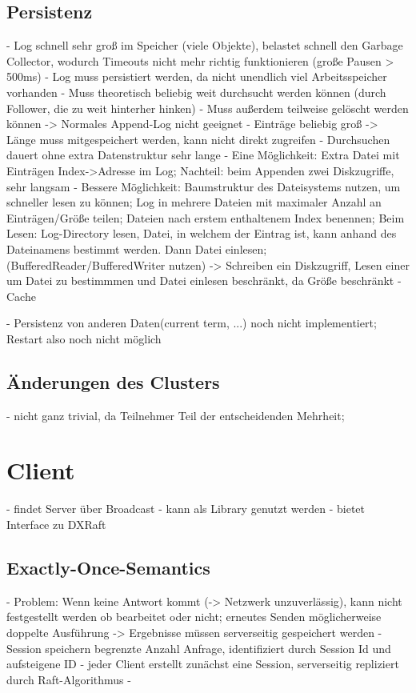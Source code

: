 \subsection{Persistenz}

- Log schnell sehr groß im Speicher (viele Objekte), belastet schnell den Garbage Collector, wodurch Timeouts nicht mehr richtig funktionieren (große Pausen > 500ms)
- Log muss persistiert werden, da nicht unendlich viel Arbeitsspeicher vorhanden
- Muss theoretisch beliebig weit durchsucht werden können (durch Follower, die zu weit hinterher hinken)
- Muss außerdem teilweise gelöscht werden können -> Normales Append-Log nicht geeignet
- Einträge beliebig groß -> Länge muss mitgespeichert werden, kann nicht direkt zugreifen
- Durchsuchen dauert ohne extra Datenstruktur sehr lange
- Eine Möglichkeit: Extra Datei mit Einträgen Index->Adresse im Log; Nachteil: beim Appenden zwei Diskzugriffe, sehr langsam
- Bessere Möglichkeit: Baumstruktur des Dateisystems nutzen, um schneller lesen zu können; Log in mehrere Dateien mit maximaler Anzahl an Einträgen/Größe teilen; Dateien nach erstem enthaltenem Index benennen; Beim Lesen: Log-Directory lesen, Datei, in welchem der Eintrag ist, kann anhand des Dateinamens bestimmt werden. Dann Datei einlesen; (BufferedReader/BufferedWriter nutzen) -> Schreiben ein Diskzugriff, Lesen einer um Datei zu bestimmmen und Datei einlesen beschränkt, da Größe beschränkt
- Cache

- Persistenz von anderen Daten(current term, ...) noch nicht implementiert; Restart also noch nicht möglich

\subsection{Änderungen des Clusters}

- nicht ganz trivial, da Teilnehmer Teil der entscheidenden Mehrheit; 

\section{Client}

- findet Server über Broadcast
- kann als Library genutzt werden
- bietet Interface zu DXRaft

\subsection{Exactly-Once-Semantics}

- Problem: Wenn keine Antwort kommt (-> Netzwerk unzuverlässig), kann nicht festgestellt werden ob bearbeitet oder nicht; erneutes Senden möglicherweise doppelte Ausführung -> Ergebnisse müssen serverseitig gespeichert werden
- Session speichern begrenzte Anzahl Anfrage, identifiziert durch Session Id und aufsteigene ID
- jeder Client erstellt zunächst eine Session, serverseitig repliziert durch Raft-Algorithmus
- 

